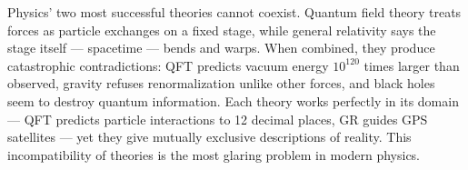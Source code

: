 Physics' two most successful theories cannot coexist. Quantum field theory treats forces as particle exchanges on a fixed stage, while general relativity says the stage itself — spacetime — bends and warps. When combined, they produce catastrophic contradictions: QFT predicts vacuum energy $10^{120}$ times larger than observed, gravity refuses renormalization unlike other forces, and black holes seem to destroy quantum information. Each theory works perfectly in its domain — QFT predicts particle interactions to 12 decimal places, GR guides GPS satellites — yet they give mutually exclusive descriptions of reality. This incompatibility of theories is the most glaring problem in modern physics.
